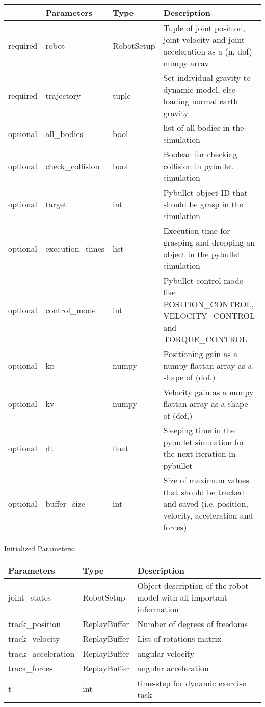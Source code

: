 \documentclass[
	ngerman,
	accentcolor=9c,%
	type=intern,
	marginpar=false
	]{tudapub}
\begin{document}
\begin{tabular}{|p{}|p{}|p{}| p{}|}
\hline
 & \textbf{Parameters} & \textbf{Type} & \textbf{Description} \\
\hline
required & robot & RobotSetup & Tuple of joint position, joint velocity and joint acceleration as a (n, dof) numpy array\\
\hline
required & trajectory & tuple & Set individual gravity to dynamic model, else loading normal earth gravity \\
\hline
optional & all\_bodies & bool & list of all bodies in the simulation \\
\hline
optional & check\_collision & bool & Boolean for checking collision in pybullet simulation \\
\hline
optional & target & int & Pybullet object ID that should be grasp in the simulation \\
\hline
optional & execution\_times & list & Execution time for grasping and dropping an object in the pybullet simulation \\
\hline
optional & control\_mode & int & Pybullet control mode like POSITION\_CONTROL, VELOCITY\_CONTROL and TORQUE\_CONTROL \\
\hline
optional & kp & numpy & Positioning gain as a numpy flattan array as a shape of (dof,) \\
\hline
optional & kv & numpy & Velocity gain as a numpy flattan array as a shape of (dof,)
 \\
\hline
optional & dt & float & Sleeping time in the pybullet simulation for the next iteration in pybullet\\
\hline
optional & buffer\_size & int & Size of maximum values that should be tracked and saved (i.e. position, velocity,   acceleration and forces) \\
\hline
\end{tabular}
\vspace{0.5cm}
    

\noindent Initialized Parameters:


\vspace{0.5cm}
\begin{tabular}{|p{}| p{}| p{}|}
\hline
\textbf{Parameters} & \textbf{Type} & \textbf{Description} \\
\hline
joint\_states & RobotSetup & Object description of the robot model with all important information \\
\hline
track\_position & ReplayBuffer & Number of degrees of freedoms \\
\hline
track\_velocity & ReplayBuffer & List of rotations matrix  \\
\hline
track\_acceleration & ReplayBuffer & angular velocity \\
\hline
track\_forces & ReplayBuffer & angular acceleration \\
\hline
t & int & time-step for dynamic exercise task \\
\hline

\end{tabular}
\end{document}
